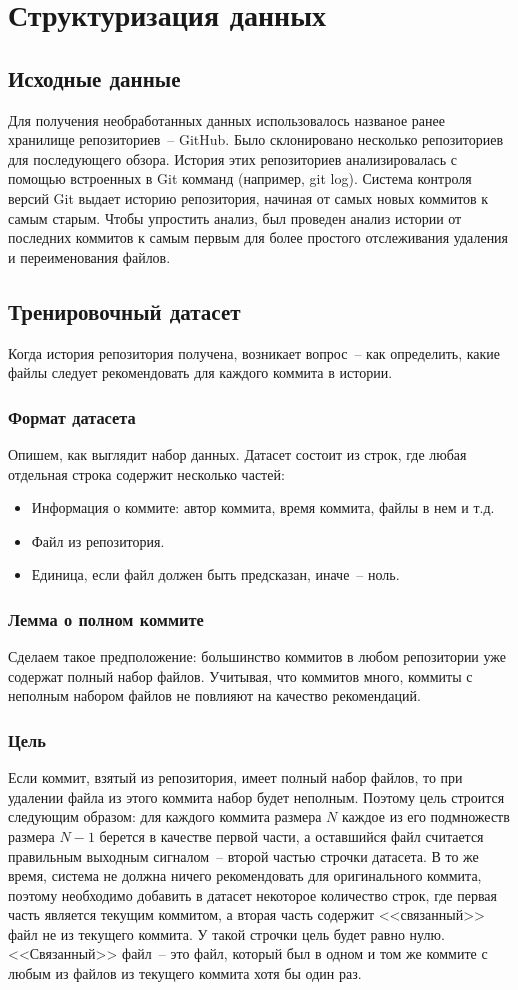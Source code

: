 \section{Структуризация данных}
\subsection{Исходные данные}
Для получения необработанных данных использовалось названое ранее хранилище репозиториев~-- GitHub. Было склонировано несколько репозиториев для последующего обзора. История этих репозиториев анализировалась с помощью встроенных в Git комманд (например, git log). Система контроля версий Git выдает историю репозитория, начиная от самых новых коммитов к самым старым. Чтобы упростить анализ, был проведен анализ истории от последних коммитов к самым первым для более простого отслеживания удаления и переименования файлов.
\subsection{Тренировочный датасет}
Когда история репозитория получена, возникает вопрос~-- как определить, какие файлы следует рекомендовать для каждого коммита в истории.
\subsubsection{Формат датасета}
Опишем, как выглядит набор данных. Датасет состоит из строк, где любая отдельная строка содержит несколько частей:
    \begin{itemize}
		\item Информация о коммите: автор коммита, время коммита, файлы в нем и т.д.
		\item Файл из репозитория.
		\item Единица, если файл должен быть предсказан, иначе~-- ноль.
	\end{itemize}
\subsubsection{Лемма о полном коммите}
Сделаем такое предположение: большинство коммитов в любом репозитории уже содержат полный набор файлов. Учитывая, что коммитов много, коммиты с неполным набором файлов не повлияют на качество рекомендаций.
\subsubsection{Цель}
Если коммит, взятый из репозитория, имеет полный набор файлов, то при удалении файла из этого коммита набор будет неполным. Поэтому цель строится следующим образом: для каждого коммита размера $N$ каждое из его подмножеств размера $N - 1$ берется в качестве первой части, а оставшийся файл считается правильным выходным сигналом~-- второй частью строчки датасета. В то же время, система не должна ничего рекомендовать для оригинального коммита, поэтому необходимо добавить в датасет некоторое количество строк, где первая часть является текущим коммитом, а вторая часть содержит <<связанный>> файл не из текущего коммита. У такой строчки цель будет равно нулю. <<Связанный>> файл~-- это файл, который был в одном и том же коммите с любым из файлов из текущего коммита хотя бы один раз.
